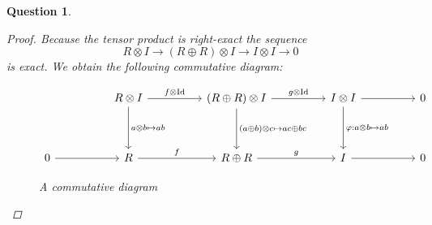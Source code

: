 \documentclass{article}
\DeclareMathOperator{\Id}{Id}
\newtheorem{question}{Question}
\theoremstyle{definition}
\begin{document}
\begin{question}
\begin{enumerate}[(a)]
              \begin{proof}
                  Because the tensor product is right-exact the sequence
                  \[
                      R\otimes I\to (R\oplus R)\otimes I\to I\otimes I\to 0
                  \]
                  is exact. We obtain the following commutative diagram:
                  \begin{figure}[H]
                      \[
                          \begin{tikzcd}[ampersand replacement=\&]
                              \&\& {R\otimes I} \&\& {(R\oplus R)\otimes I} \&\& {I\otimes I} \&\& 0 \\
                              \\
                              0 \&\& R \&\& {R\oplus R} \&\& I \&\& 0
                              \arrow["f\otimes\Id", from=1-3, to=1-5]
                              \arrow["g\otimes\Id", from=1-5, to=1-7]
                              \arrow[from=1-7, to=1-9]
                              \arrow["{a\otimes b\mapsto ab}", from=1-3, to=3-3]
                              \arrow["{(a\oplus b)\otimes c\mapsto ac\oplus bc}", from=1-5, to=3-5]
                              \arrow["{\varphi:a\otimes b\mapsto ab}", from=1-7, to=3-7]
                              \arrow["f", from=3-3, to=3-5]
                              \arrow["g", from=3-5, to=3-7]
                              \arrow[from=3-1, to=3-3]
                              \arrow[from=3-7, to=3-9]
                          \end{tikzcd}
                      \]
                      \caption{A commutative diagram}
                  \end{figure}


\end{proof}
\end{enumerate}
\end{question}
\end{document}
